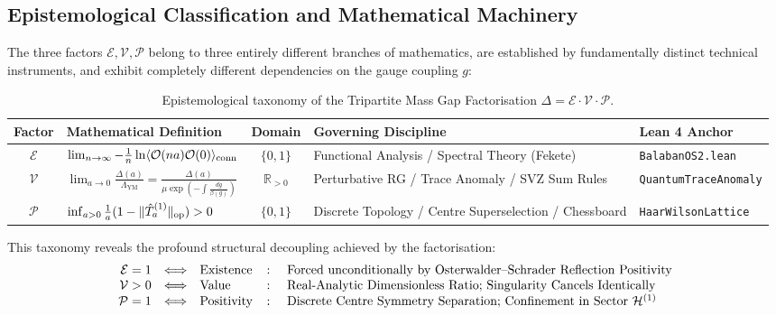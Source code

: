 \subsection{Epistemological Classification and Mathematical Machinery}
\label{subsec:epistemological_classification}

The three factors $\mathcal{E}, \mathcal{V}, \mathcal{P}$ belong to three entirely different branches of mathematics, are established by fundamentally distinct technical instruments, and exhibit completely different dependencies on the gauge coupling $g$:

\begin{table}[htbp]
\centering
\small
\renewcommand{\arraystretch}{1.3}
\begin{tabular}{|c|p{4.2cm}|c|p{3.8cm}|p{2.8cm}|}
\hline
\textbf{Factor} & \textbf{Mathematical Definition} & \textbf{Domain} & \textbf{Governing Discipline} & \textbf{Lean 4 Anchor} \\
\hline
$\mathcal{E}$ & $\lim_{n \to \infty} -\frac{1}{n} \ln \langle \mathcal{O}(na) \mathcal{O}(0) \rangle_{\mathrm{conn}}$ & $\{0, 1\}$ & Functional Analysis / Spectral Theory (Fekete) & \texttt{BalabanOS2.lean} \\
\hline
$\mathcal{V}$ & $\lim_{a \to 0} \frac{\Delta(a)}{\Lambda_{\mathrm{YM}}} = \frac{\Delta(a)}{\mu \exp(-\int \frac{dg}{\beta(g)})}$ & $\mathbb{R}_{>0}$ & Perturbative RG / Trace Anomaly / SVZ Sum Rules & \texttt{QuantumTraceAnomaly} \\
\hline
$\mathcal{P}$ & $\inf_{a > 0} \frac{1}{a}(1 - \|\hat{T}_a^{(1)}\|_{\mathrm{op}}) > 0$ & $\{0, 1\}$ & Discrete Topology / Centre Superselection / Chessboard & \texttt{HaarWilsonLattice} \\
\hline
\end{tabular}
\caption{Epistemological taxonomy of the Tripartite Mass Gap Factorisation $\Delta = \mathcal{E} \cdot \mathcal{V} \cdot \mathcal{P}$.}
\label{tab:factorisation_taxonomy}
\end{table}

This taxonomy reveals the profound structural decoupling achieved by the factorisation:
\begin{equation}
\label{eq:factorisation_decoupling_triad}
\begin{array}{r@{\quad\Longleftrightarrow\quad}l@{\quad\colon\quad}l}
\mathcal{E} = 1 & \text{Existence} & \text{Forced unconditionally by Osterwalder--Schrader Reflection Positivity} \\
\mathcal{V} > 0 & \text{Value} & \text{Real-Analytic Dimensionless Ratio; Singularity Cancels Identically} \\
\mathcal{P} = 1 & \text{Positivity} & \text{Discrete Centre Symmetry Separation; Confinement in Sector } \mathcal{H}^{(1)}
\end{array}
\end{equation}


